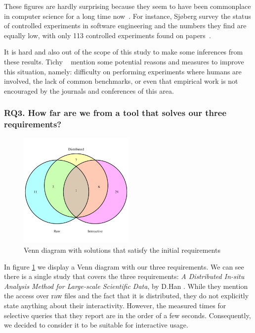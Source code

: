 These figures are hardly surprising because they seem to have been commonplace
in computer science for a long time now~\cite{TICHY1995,ZELKOWITZ1997,Sjoberg2005}.
For instance, Sjøberg \etal survey the status of controlled experiments
in software engineering and the numbers they find are equally low, with
only 113 controlled experiments found on  papers~\cite{Sjoberg2005}.

It is hard and also out of the scope of this study to make some inferences from these
results. Tichy \etal~\cite{TICHY1995} mention some potential reasons and measures
to improve this situation, namely: difficulty on performing experiments where humans
are involved, the lack of common benchmarks, or even that empirical work is not
encouraged by the journals and conferences of this area.

\subsubsection{RQ3. How far are we from a tool that solves our three requirements?}

\begin{figure}[htbp]
    \centering
    \includegraphics[width=0.5\textwidth]{images/3_mapping/venn}
    \caption{Venn diagram with solutions that satisfy the initial requirements}
    \label{fig:mapping/venn_requirements}
\end{figure}

In figure \ref{fig:mapping/venn_requirements} we display a Venn diagram with our three
requirements. We can see there is a single study that covers the three requirements:
\textit{{A} {D}istributed {I}n-situ {A}nalysis {M}ethod for {L}arge-scale
{S}cientific {D}ata}, by D.Han \etal\cite{Han2017}. While they mention the
access over raw files and the fact that it is distributed, they do not
explicitly state anything about their interactivity. However, the measured times
for selective queries that they report are in the order of a few seconds. Consequently, we
decided to consider it to be suitable for interactive usage.

